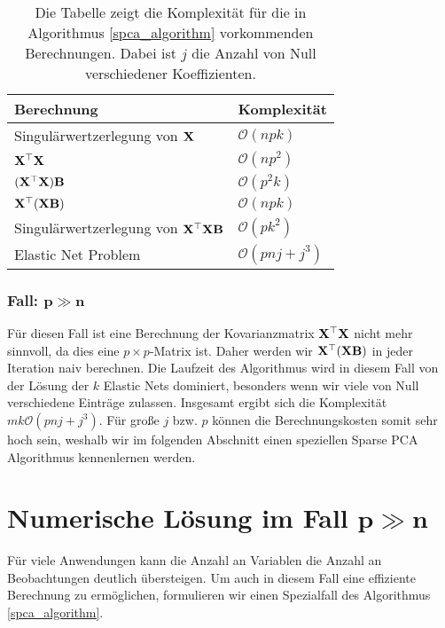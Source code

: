 \begin{table}
\centering
\begin{tabular}{ll}
Berechnung & Komplexität\\\hline\addlinespace
Singulärwertzerlegung von $\mathbf{X}$ & $\mathcal{O}(npk)$\\
$\mathbf{X}^{\top}\mathbf{X}$ & $\mathcal{O}(np^2)$\\
$(\mathbf{X}^{\top}\mathbf{X}) \mathbf{B}$ & $\mathcal{O}(p^2k)$\\
$\mathbf{X}^{\top} (\mathbf{X} \mathbf{B})$ & $\mathcal{O}(npk)$\\
Singulärwertzerlegung von $\mathbf{X}^{\top}\mathbf{X} \mathbf{B}$ & $\mathcal{O}(pk^2)$\\
Elastic Net Problem & $\mathcal{O}(pnj + j^3)$
\end{tabular}
\caption{Die Tabelle zeigt die Komplexität für die in Algorithmus \ref{spca_algorithm} vorkommenden Berechnungen. Dabei ist $j$ die Anzahl von Null verschiedener Koeffizienten.}
\label{complexity_calculation}
\end{table}

\subsubsection{Fall: $\mathbf{p \gg n}$}

Für diesen Fall ist eine Berechnung der Kovarianzmatrix $\mathbf{X}^{\top}\mathbf{X}$ nicht mehr sinnvoll, da dies eine $p \times p$-Matrix ist. Daher werden wir $\mathbf{X}^{\top}(\mathbf{X} \mathbf{B})$ in jeder Iteration naiv berechnen. Die Laufzeit des Algorithmus wird in diesem Fall von der Lösung der $k$ Elastic Nets dominiert, besonders wenn wir viele von Null verschiedene Einträge zulassen. Insgesamt ergibt sich die Komplexität $mk\mathcal{O}(pnj + j^3)$. Für große $j$ bzw. $p$ können die Berechnungskosten somit sehr hoch sein, weshalb wir im folgenden Abschnitt einen speziellen Sparse PCA Algorithmus kennenlernen werden.



\section{Numerische Lösung im Fall $\mathbf{p \gg n}$}
\label{numerical_solution_p_greater_n}

Für viele Anwendungen kann die Anzahl an Variablen die Anzahl an Beobachtungen deutlich übersteigen. Um auch in diesem Fall eine effiziente Berechnung zu ermöglichen, formulieren wir einen Spezialfall des Algorithmus \ref{spca_algorithm}.

